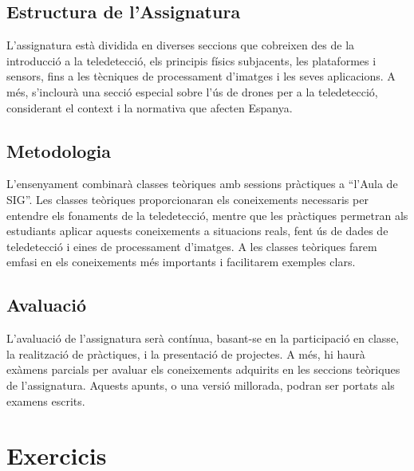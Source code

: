 \documentclass[
]{book}
\begin{document}
\hypertarget{estructura-de-lassignatura}{%
\subsection*{Estructura de l'Assignatura}\label{estructura-de-lassignatura}}

L'assignatura està dividida en diverses seccions que cobreixen des de la introducció a la teledetecció, els principis físics subjacents, les plataformes i sensors, fins a les tècniques de processament d'imatges i les seves aplicacions. A més, s'inclourà una secció especial sobre l'ús de drones per a la teledetecció, considerant el context i la normativa que afecten Espanya.

\hypertarget{metodologia}{%
\subsection*{Metodologia}\label{metodologia}}

L'ensenyament combinarà classes teòriques amb sessions pràctiques a ``l'Aula de SIG''. Les classes teòriques proporcionaran els coneixements necessaris per entendre els fonaments de la teledetecció, mentre que les pràctiques permetran als estudiants aplicar aquests coneixements a situacions reals, fent ús de dades de teledetecció i eines de processament d'imatges. A les classes teòriques farem emfasi en els coneixements més importants i facilitarem exemples clars.

\hypertarget{avaluaciuxf3}{%
\subsection*{Avaluació}\label{avaluaciuxf3}}

L'avaluació de l'assignatura serà contínua, basant-se en la participació en classe, la realització de pràctiques, i la presentació de projectes. A més, hi haurà exàmens parcials per avaluar els coneixements adquirits en les seccions teòriques de l'assignatura. Aquests apunts, o una versió millorada, podran ser portats als examens escrits.

\hypertarget{exercicis}{%
\section{Exercicis}\label{exercicis}}
\end{document}
